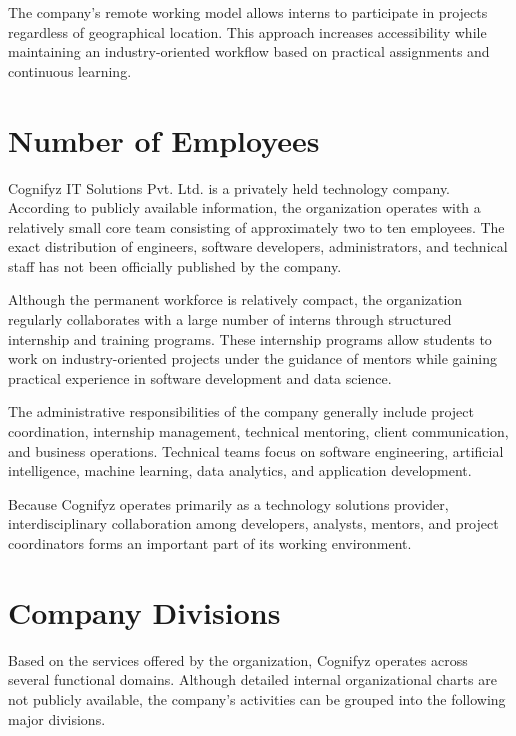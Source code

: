 \documentclass[12pt,a4paper]{report}
\begin{document}
The company's remote working model allows interns to participate in projects regardless of geographical location. This approach increases accessibility while maintaining an industry-oriented workflow based on practical assignments and continuous learning.


\section{Number of Employees}

Cognifyz IT Solutions Pvt. Ltd. is a privately held technology company. According to publicly available information, the organization operates with a relatively small core team consisting of approximately two to ten employees. The exact distribution of engineers, software developers, administrators, and technical staff has not been officially published by the company.

Although the permanent workforce is relatively compact, the organization regularly collaborates with a large number of interns through structured internship and training programs. These internship programs allow students to work on industry-oriented projects under the guidance of mentors while gaining practical experience in software development and data science.

The administrative responsibilities of the company generally include project coordination, internship management, technical mentoring, client communication, and business operations. Technical teams focus on software engineering, artificial intelligence, machine learning, data analytics, and application development.

Because Cognifyz operates primarily as a technology solutions provider, interdisciplinary collaboration among developers, analysts, mentors, and project coordinators forms an important part of its working environment.


\section{Company Divisions}

Based on the services offered by the organization, Cognifyz operates across several functional domains. Although detailed internal organizational charts are not publicly available, the company's activities can be grouped into the following major divisions.
\end{document}
